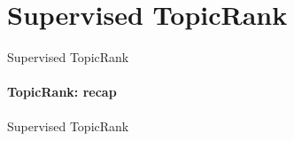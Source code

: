 \section{Supervised TopicRank}
  \begin{frame}{Supervised TopicRank}
    \framesubtitle{TopicRank: recap}
  \end{frame}

  \begin{frame}{Supervised TopicRank}
  \end{frame}

